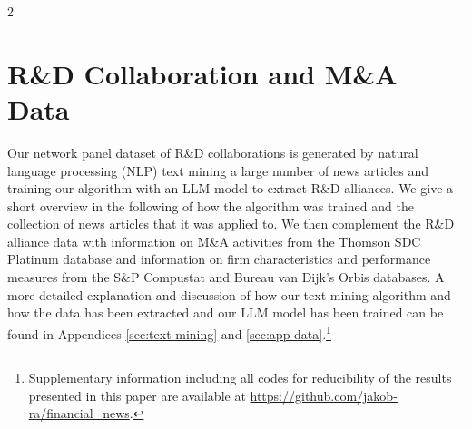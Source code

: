 \documentclass[12pt]{article}
\begin{document}
\begin{spacing}{2}
\section{R\&D Collaboration and M\&A Data} %
\label{sec:data}
Our network panel dataset of R\&D collaborations is generated by natural language processing (NLP) text mining a large number of news articles and training our algorithm with an LLM model to extract R\&D alliances. We give a short overview in the following of how the algorithm was trained and the collection of news articles that it was applied to. We then complement the R\&D alliance data with information on M\&A activities from the Thomson SDC Platinum database and information on firm characteristics and performance measures from the S\&P Compustat and Bureau van Dijk's Orbis databases. A more detailed explanation and discussion of how our text mining algorithm and how the data has been extracted and our LLM model has been trained can be found in Appendices \ref{sec:text-mining} and \ref{sec:app-data}.\footnote{Supplementary information including all codes for reducibility of the results presented in this paper are available at \url{https://github.com/jakob-ra/financial_news}.}


\end{spacing}
\end{document}
